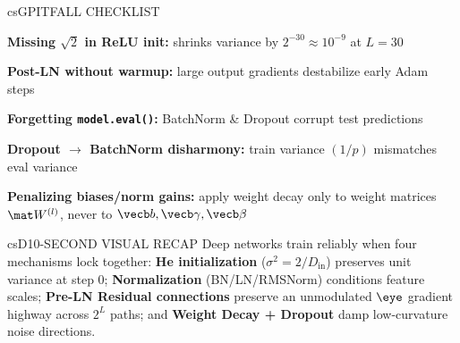 \documentclass[../../../../master.tex]{subfiles}
\begin{document}
\begin{cscolumns}
\begin{cscard}{csG}{PITFALL CHECKLIST}
  \begin{csbul}
    \item \textbf{Missing $\sqrt{2}$ in ReLU init:} shrinks variance by $2^{-30}\approx 10^{-9}$ at $L=30$
    \item \textbf{Post-LN without warmup:} large output gradients destabilize early Adam steps
    \item \textbf{Forgetting \texttt{model.eval()}:} BatchNorm \& Dropout corrupt test predictions
    \item \textbf{Dropout $\to$ BatchNorm disharmony:} train variance $(1/p)$ mismatches eval variance
    \item \textbf{Penalizing biases/norm gains:} apply weight decay only to weight matrices $\mat W^{(l)}$, never to $\vecb b,\vecb\gamma,\vecb\beta$
  \end{csbul}
\end{cscard}

\begin{cscard}{csD}{10-SECOND VISUAL RECAP}
  \sffamily\footnotesize
  Deep networks train reliably when four mechanisms lock together: \textbf{He initialization} ($\sigma^2=2/D_{\text{in}}$) preserves unit variance at step $0$; \textbf{Normalization} (BN/LN/RMSNorm) conditions feature scales; \textbf{Pre-LN Residual connections} preserve an unmodulated $\eye$ gradient highway across $2^L$ paths; and \textbf{Weight Decay + Dropout} damp low-curvature noise directions.
\end{cscard}
\end{cscolumns}

\csend
\end{document}

